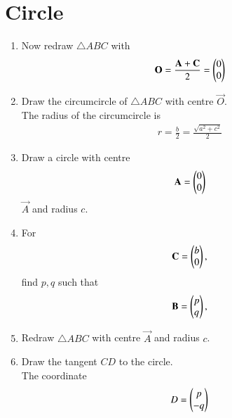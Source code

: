 \documentclass[journal,12pt,twocolumn]{IEEEtran}
\renewcommand\thesection{\arabic{section}}
\begin{document}
\section{Circle}
\begin{enumerate}[label=\thesection.\arabic*
,ref=\thesection.\theenumi]
\item Now redraw $\triangle ABC$ with 
\begin{align}
\label{eq:rt_triang_circum}
\mathbf{O}=\frac{\mathbf{A}+\mathbf{C}}{2}=\begin{pmatrix}0 \\0\end{pmatrix}
\end{align}
\item Draw the circumcircle of  $\triangle ABC$ with centre $\vec{O}$.  
\\
\solution The radius of the circumcircle is 
\begin{align}
\label{eq:rt_triang_circum_rad}
r=\frac{b}{2}=\frac{\sqrt{a^2+c^2}}{2}
\end{align}
\item Draw a circle with centre 
\begin{align}
\mathbf{A}=\begin{pmatrix}0 \\0\end{pmatrix}
\end{align}
%
$\vec{A}$ 
and radius $c$.
\item For 
\begin{align}
\mathbf{C}=\begin{pmatrix}b \\0\end{pmatrix}, 
\end{align}
find $p,q$ such that
\begin{align}
\mathbf{B}=\begin{pmatrix}p \\q\end{pmatrix}, 
\end{align}
\item Redraw $\triangle ABC$ with centre $\vec{A}$ and radius $c$.
\item Draw the tangent $CD$ to the circle.
\\
\solution The coordinate
\begin{align}
\label{eq:rt_tang_pair}
D=\myvec{p \\ -q}

\end{align}
\end{enumerate}
\end{document}

